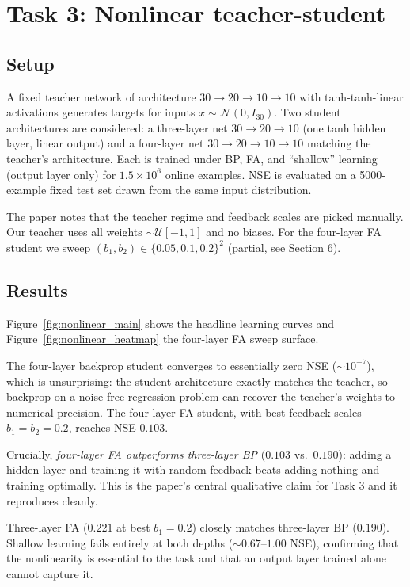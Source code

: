 \documentclass[11pt,a4paper]{article}
\begin{document}
\section{Task 3: Nonlinear teacher-student}

\subsection{Setup}

A fixed teacher network of architecture $30 \to 20 \to 10 \to 10$ with
tanh-tanh-linear activations generates targets for inputs
$x \sim \mathcal{N}(0, I_{30})$. Two student architectures are considered:
a three-layer net $30 \to 20 \to 10$ (one tanh hidden layer, linear output)
and a four-layer net $30 \to 20 \to 10 \to 10$ matching the teacher's
architecture. Each is trained under BP, FA, and ``shallow'' learning
(output layer only) for $1.5 \times 10^6$ online examples. NSE is
evaluated on a 5000-example fixed test set drawn from the same input
distribution.

The paper notes that the teacher regime and feedback scales are picked
manually. Our teacher uses all weights $\sim \mathcal{U}[-1, 1]$ and no
biases. For the four-layer FA student we sweep
$(b_1, b_2) \in \{0.05, 0.1, 0.2\}^2$ (partial, see Section 6).

\subsection{Results}

Figure~\ref{fig:nonlinear_main} shows the headline learning curves and
Figure~\ref{fig:nonlinear_heatmap} the four-layer FA sweep surface.

The four-layer backprop student converges to essentially zero NSE
($\sim 10^{-7}$), which is unsurprising: the student architecture exactly
matches the teacher, so backprop on a noise-free regression problem can
recover the teacher's weights to numerical precision. The four-layer FA
student, with best feedback scales $b_1 = b_2 = 0.2$, reaches NSE $0.103$.

Crucially, \emph{four-layer FA outperforms three-layer BP} ($0.103$ vs.\
$0.190$): adding a hidden layer and training it with random feedback beats
adding nothing and training optimally. This is the paper's central
qualitative claim for Task 3 and it reproduces cleanly.

Three-layer FA ($0.221$ at best $b_1 = 0.2$) closely matches three-layer
BP ($0.190$). Shallow learning fails entirely at both depths
($\sim 0.67$--$1.00$ NSE), confirming that the nonlinearity is essential
to the task and that an output layer trained alone cannot capture it.
\end{document}
